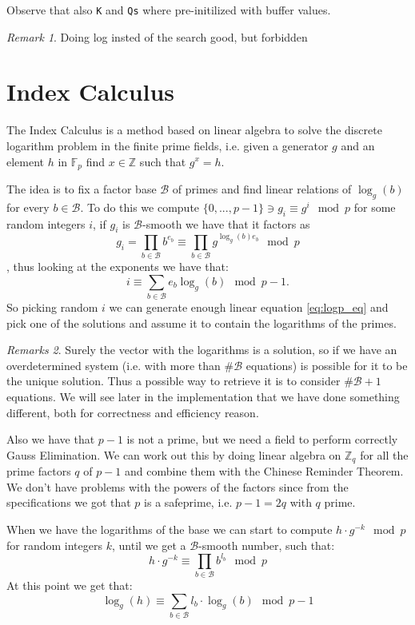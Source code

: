 \documentclass{article}
\newcommand{\ZZ}{\mathbb{Z}}
\newcommand{\F}{\mathbb{F}}
\newcommand{\BB}{\mathcal{B}}
\theoremstyle{plain}
\theoremstyle{remark}
\newtheorem{rem}{Remark}
\newtheorem{rems}[rem]{Remarks}
\theoremstyle{definition}
\begin{document}
Observe that also \verb|K| and \verb|Qs| where pre-initilized with buffer values. 

\begin{rem} %
	Doing log insted of the search good, but forbidden
\end{rem}


\section{Index Calculus}

The Index Calculus is a method based on linear algebra to solve the discrete logarithm problem in the finite prime fields, i.e. given a generator $g$ and an element $h$ in $ \F_p$ find $x \in \ZZ$ such that $g^x = h$. 

The idea is to fix a factor base $\mathcal{B}$ of primes and find linear relations of $\log_g(b)$ for every $b \in \mathcal{B}$. To do this we compute $\{0,...,p-1\} \ni g_i \equiv g^i \mod p$ for some random integers $i$, if $g_i$ is $\mathcal{B}$-smooth we have that it factors as 
\[
g_i = \prod_{b \in \BB}b^{e_b} \equiv \prod_{b \in \BB} g^{\log_g(b) e_b} \mod p
\]
, thus looking at the exponents we have that:
\begin{equation}
	\label{eq:logp_eq}
	i \equiv \sum_{b \in \BB} e_b \log_g(b) \mod p-1 . 
\end{equation}
So picking random $i$ we can generate enough linear equation \ref{eq:logp_eq} and pick one of the solutions and assume it to contain the logarithms of the primes.

\begin{rems} \label{rem:num_eq}
	Surely the vector with the logarithms is a solution, so if we have an overdetermined system (i.e. with more than $\#\BB$ equations) is possible for it to be the unique solution. Thus a possible way to retrieve it is to consider $\#\BB +1$ equations. We will see later in the implementation that we have done something different, both for correctness and efficiency reason. 

	Also we have that $p-1$ is not a prime, but we need a field to perform correctly Gauss Elimination. We can work out this by doing linear algebra on $\ZZ_q$ for all the prime factors $q$ of $p-1$ and combine them with the Chinese Reminder Theorem. We don't have problems with the powers of the factors since from the specifications we got that $p$ is a safeprime, i.e. $p-1 = 2q$ with $q$ prime. 
\end{rems}

When we have the logarithms of the base we can start to compute $h\cdot g^{-k} \mod p$ for random integers $k$, until we get a $\BB$-smooth number, such that:
\begin{equation*}
	h\cdot g^{-k} \equiv \prod_{b \in \BB} b^{l_b} \mod p
\end{equation*}
At this point we get that:
\begin{equation}
	\label{eq:dlog_final1}
	\log_g(h) \equiv \sum_{b \in \BB} l_b \cdot \log_g(b) \mod p-1
\end{equation}
\end{document}
